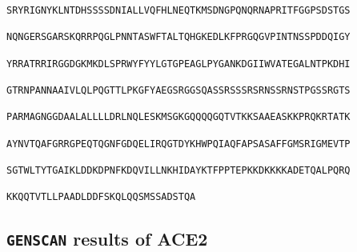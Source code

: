 \documentclass[en,black,10pt,normal]{elegantnote}
\begin{document}
\begin{lstlisting}[frame=single]
SRYRIGNYKLNTDHSSSSDNIALLVQFHLNEQTKMSDNGPQNQRNAPRITFGGPSDSTGS

NQNGERSGARSKQRRPQGLPNNTASWFTALTQHGKEDLKFPRGQGVPINTNSSPDDQIGY

YRRATRRIRGGDGKMKDLSPRWYFYYLGTGPEAGLPYGANKDGIIWVATEGALNTPKDHI

GTRNPANNAAIVLQLPQGTTLPKGFYAEGSRGGSQASSRSSSRSRNSSRNSTPGSSRGTS

PARMAGNGGDAALALLLLDRLNQLESKMSGKGQQQQGQTVTKKSAAEASKKPRQKRTATK

AYNVTQAFGRRGPEQTQGNFGDQELIRQGTDYKHWPQIAQFAPSASAFFGMSRIGMEVTP

SGTWLTYTGAIKLDDKDPNFKDQVILLNKHIDAYKTFPPTEPKKDKKKKADETQALPQRQ

KKQQTVTLLPAADLDDFSKQLQQSMSSADSTQA
\end{lstlisting}


\subsection{\texttt{GENSCAN} results of ACE2}
\end{document}
